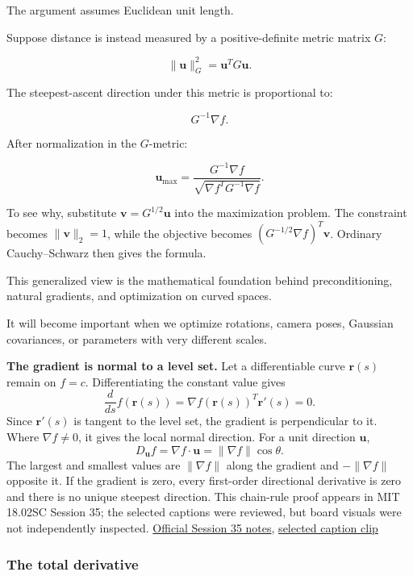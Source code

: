 \hypertarget{02-foundations-ii-ch021-a-subtle-limitation-steepest-according-to-which-distance}{}

The argument assumes Euclidean unit length.

Suppose distance is instead measured by a positive-definite metric matrix \(G\):

\[
\|\mathbf u\|_G^2=\mathbf u^TG\mathbf u.
\]

The steepest-ascent direction under this metric is proportional to:

\[
G^{-1}\nabla f.
\]

After normalization in the \(G\)-metric:

\[
\mathbf u_{\max} = \frac{G^{-1}\nabla f} {\sqrt{\nabla f^TG^{-1}\nabla f}}.
\]

To see why, substitute \(\mathbf v=G^{1/2}\mathbf u\) into the maximization problem. The constraint becomes \(\|\mathbf v\|_2=1\), while the objective becomes \((G^{-1/2}\nabla f)^T\mathbf v\). Ordinary Cauchy--Schwarz then gives the formula.

This generalized view is the mathematical foundation behind preconditioning, natural gradients, and optimization on curved spaces.

It will become important when we optimize rotations, camera poses, Gaussian covariances, or parameters with very different scales.

\textbf{The gradient is normal to a level set.} Let a differentiable curve \(\mathbf r(s)\) remain on \(f=c\). Differentiating the constant value gives \[
\frac{d}{ds}f(\mathbf r(s))=\nabla f(\mathbf r(s))^T\mathbf r'(s)=0.
\] Since \(\mathbf r'(s)\) is tangent to the level set, the gradient is perpendicular to it. Where \(\nabla f\ne0\), it gives the local normal direction. For a unit direction \(\mathbf u\), \[
D_{\mathbf u}f=\nabla f\cdot\mathbf u=\|\nabla f\|\cos\theta.
\] The largest and smallest values are \(\|\nabla f\|\) along the gradient and \(-\|\nabla f\|\) opposite it. If the gradient is zero, every first-order directional derivative is zero and there is no unique steepest direction. This chain-rule proof appears in MIT 18.02SC Session 35; the selected captions were reviewed, but board visuals were not independently inspected. \href{https://ocw.mit.edu/courses/18-02sc-multivariable-calculus-fall-2010/6d4f46e89733b7291f86a22882aa2311_MIT18_02SC_notes_18.pdf}{Official Session 35 notes}, \href{https://www.youtube.com/watch?v=2XraaWefBd8}{selected caption clip}

\subsubsection{The total derivative}\label{02-foundations-ii-ch021-the-total-derivative}

